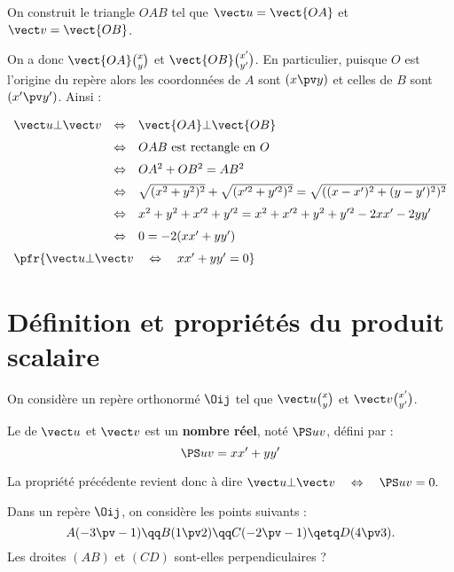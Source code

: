\documentclass[10pt,openright,twoside,french]{book}
\begin{document}
\begin{Demo}
    On construit le triangle $OAB$ tel que $\vect u = \vect{OA}$ et $\vect v = \vect{OB}$.\par
    On a donc $\vect{OA}\binom x y$ et $\vect{OB} \binom{x'}{y'}$. En particulier, puisque $O$ est l'origine du repère alors les coordonnées de $A$ sont $(x \pv y)$ et celles de $B$ sont $(x' \pv y')$. Ainsi :
    \[\renewcommand\arraystretch{1.5}\begin{array}{r@{\quad \Leftrightarrow \quad}l}
        \vect u \bot \vect v & \vect{OA} \bot \vect{OB} \\
                                     & OAB \text{ est rectangle en $O$} \\
                                     & OA^2 + OB^2 = AB^2 \\
                                     & \sqrt{(x^2 + y^2)^2} + \sqrt{(x'^2 + y'^2)^2} = \sqrt{((x - x')^2 + (y - y')^2)^2} \\
                                     & x^2 + y^2 + x'^2 + y'^2 = x^2 +x'^2 + y^2 + y'^2 - 2xx' - 2yy' \\
                                     & 0 = -2(xx' + yy') \\
        \multicolumn{2}{l}{\pfr{\vect u \bot \vect v \quad \Leftrightarrow \quad xx' + yy' = 0}}
    \end{array}\]
\end{Demo}

\section{Définition et propriétés du produit scalaire}

\begin{Defi}
    On considère un repère orthonormé $\Oij$ tel que $\vect u\binom x y$ et $\vect v \binom{x'}{y'}$.\par
    Le  de $\vect u$ et $\vect v$ est un \textbf{nombre réel}, noté $\PS u v$, défini par :
    \[\PS u v = xx' + yy'\]
\end{Defi}

\begin{Rmq}
    La propriété précédente revient donc à dire $\vect u \bot \vect v \quad \Leftrightarrow \quad \PS u v = 0.$
\end{Rmq}

\begin{Exemple}
    Dans un repère $\Oij$, on considère les points suivants :
    \[A(-3 \pv -1) \qq B(1 \pv 2) \qq C(-2 \pv -1) \qetq D(4 \pv 3).\]
    Les droites $(AB)$ et $(CD)$ sont-elles perpendiculaires ?
\end{Exemple}
\end{document}

